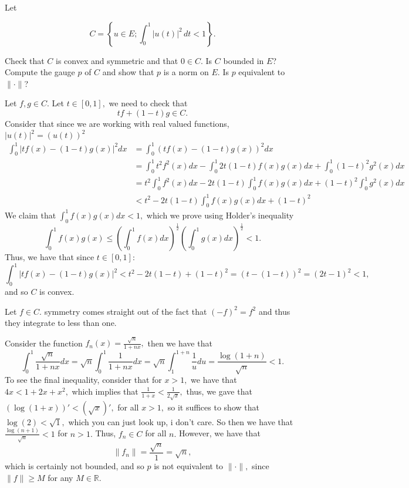 \documentclass[11pt]{article}
\newcommand{\bbR}{\mathbb{R}}
\begin{document}
\begin{problem}
\begin{enumerate}
Let


\[
C = \left\{ u \in E; \int_0^1 |u(t)|^2 \, dt < 1 \right\}.
\]



Check that \( C \) is convex and symmetric and that \( 0 \in C \). Is \( C \) bounded in \( E \)? Compute the gauge \( p \) of \( C \) and show that \( p \) is a norm on \( E \). Is \( p \) equivalent to \( \| \cdot \| \)?
\begin{solution}
    Let $f,g \in C.$ Let $t \in [0,1],$ we need to check that 
    \[tf + (1-t)g \in C.\] Consider that since we are working with real valued functions, $|u(t)|^2 = (u(t))^2$
\begin{align*}
    \int_0^1 |tf(x) - (1-t)g(x)|^2 dx &= \int_0^1 (tf(x) - (1-t)g(x))^2 dx\\
    &= \int_0^1 t^2 f^2(x)dx - \int_0^1 2t(1-t)f(x)g(x)dx + \int_0^1 (1-t)^2 g^2(x)dx\\
    &= t^2\int_0^1 f^2(x)dx - 2t(1-t)\int_0^1 f(x)g(x)dx + (1-t)^2\int_0^1  g^2(x)dx\\
    &< t^2 - 2t(1-t)\int_0^1 f(x)g(x)dx + (1-t)^2
\end{align*}
We claim that $\int_0^1 f(x)g(x)dx < 1,$ which we prove using Holder's inequality
\[\int_0^1 f(x)g(x)\leq \left(\int_0^1 f(x)dx\right)^\frac{1}{2} \left(\int_0^1 g(x)dx\right)^\frac{1}{2} < 1.\] Thus, we have that since $t\in [0,1]:$
\[\int_0^1 |tf(x) - (1-t)g(x)|^2 < t^2 - 2t(1-t) + (1-t)^2 = (t - (1-t))^2 = (2t - 1)^2 < 1,\] and so $C$ is convex. 

Let $f\in C.$ symmetry comes straight out of the fact that $(-f)^2 = f^2$ and thus they integrate to less than one.

Consider the function $f_n(x) = \frac{\sqrt{n}}{1 + nx},$ then we have that 
\[\int_0^1 \frac{\sqrt{n}}{1+ nx} dx=\sqrt{n}\int_0^1 \frac{1}{1 + nx}dx = \sqrt{n}\int_1^{1 + n} \frac{1}{u}du = \frac{\log(1 + n)}{\sqrt{n}} < 1.\] To see the final inequality, consider that for $x>1,$ we have that $4x < 1 + 2x + x^2,$ which implies that $\frac{1}{1 + x} < \frac{1}{2\sqrt{x}},$ thus, we gave that $(\log(1 + x))' < (\sqrt{x})',$ for all $x>1,$ so it suffices to show that $ \log(2) < \sqrt{1},$ which you can just look up, i don't care. So then we have that $\frac{\log(n+1)}{\sqrt{n}}< 1$ for $n>1.$ Thus, $f_n \in C$ for all $n.$ However, we have that 
\[\|f_n\| = \frac{\sqrt{n}}{1} = \sqrt{n},\] which is certainly not bounded, and so $p$ is not equivalent to $\|\cdot\|,$ since $\|f\| \geq M$ for any $M\in \bbR.$
    \end{solution}


\end{enumerate}
\end{problem}
\end{document}
